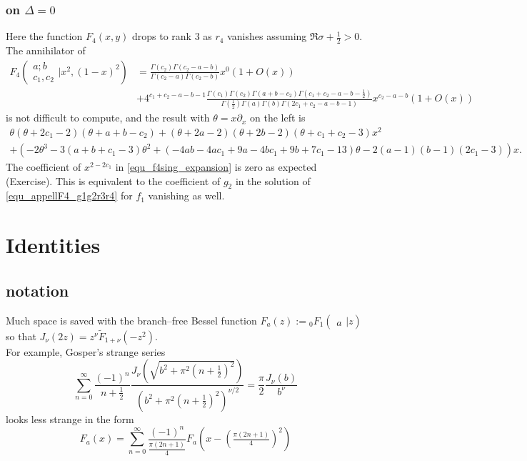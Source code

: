 \documentclass[12pt]{article}
\numberwithin{equation}{section}
\newcommand{\Head}[3] {{}_{#1}{#2}_{#3}}
\newcommand{\ArgS}[3] {( \begin{smallmatrix} #1 \\ #2 \end{smallmatrix} | {#3})}
\newcommand{\HypJ}[2] {F_{#1}(#2)}
\newcommand{\HypJreg}[2] {{\tilde{F}}_{#1}(#2)}
\newcommand{\appellFfourS}[6]    {F_4 \ArgS{{#1};{#2}}{{#3},{#4}}{{#5},{#6}}}
\begin{document}
\subsubsection{on $\Delta = 0$}
Here the function $F_4(x,y)$ drops to rank 3 as $r_4$ vanishes assuming $\Re \sigma + \frac12 > 0$. The annihilator of
\begin{equation}
\label{equ_f4sing_expansion}
\begin{aligned}
\appellFfourS{a}{b}{c_1}{c_2}{x^2}{(1-x)^2} &= \tfrac{\Gamma(c_2) \Gamma(c_2-a-b)}{\Gamma(c_2-a) \Gamma(c_2-b)} x^0 (1 + O(x))\\
 &+ 4^{c_1+c_2-a-b-1} \tfrac{\Gamma(c_1) \Gamma(c_2) \Gamma(a+b-c_2) \Gamma(c_1+c_2-a-b-\frac{1}{2})}{\Gamma(\frac12) \Gamma (a) \Gamma (b) \Gamma (2 c_1+c_2-a-b-1)} x^{c_2-a-b}(1 + O(x))
\end{aligned}
\end{equation}
is not difficult to compute, and the result with $\theta = x \partial_x$ on the left is
\begin{gather*}
\theta (\theta+2 c_1-2)(\theta+a+b-c_2)+ (\theta+2 a-2) (\theta+2 b-2)(\theta+c_1+c_2-3) x^2\\
   +(-2 \theta ^3-3(a+b+c_1-3)\theta ^2+(-4 a b-4 a c_1+9 a-4
   b c_1+9 b+7 c_1-13)\theta-2 (a-1) (b-1)(2 c_1-3))x\text{.}
\end{gather*}
The coefficient of $x^{2-2c_1}$ in \eqref{equ_f4sing_expansion} is zero as expected (Exercise).
This is equivalent to the coefficient of $g_2$ in the solution of \eqref{equ_appellF4_g1g2r3r4} for $f_1$ vanishing as well.

\section{Identities}

\subsection{notation}
Much space is saved with the branch--free Bessel function $\boxed{\HypJ{a}{z} := \Head{0}{F}{1} \ArgS{}{a}{z}}$ so that $J_{\nu}(2z) = z^{\nu} \HypJreg{1+\nu}{-z^2}$.\\
For example, Gosper's strange series
\begin{equation*}
\sum_{n=0}^{\infty} \frac{(-1)^n}{n+\frac12} \frac{J_\nu  \left(\sqrt{b^2 + \pi^2(n+\frac12)^2} \right)}{(b^2 + \pi^2(n+\frac12)^2)^{\nu/2}} = \frac{\pi}{2} \frac{J_{\nu}(b)}{b^\nu}
\end{equation*}
looks less strange in the form
\begin{equation*}
F_a(x) = \sum_{n=0}^{\infty} \frac{(-1)^n}{\tfrac{\pi(2n+1)}{4}} F_a(x-(\tfrac{\pi(2n+1)}{4})^2)
\end{equation*}
\end{document}
